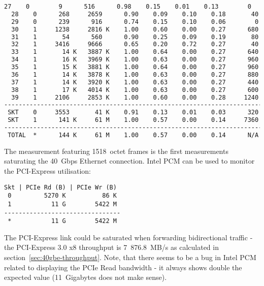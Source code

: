 \begin{lstlisting}[language=TeX]
  27    0        9      516      0.98    0.15    0.01    0.13        0
  28    0      268     2659      0.90    0.09    0.10    0.18       40
  29    0      239      916      0.74    0.15    0.10    0.06        0
  30    1     1238     2816 K    1.00    0.60    0.00    0.27      680
  31    1       54      560      0.90    0.25    0.09    0.19       80
  32    1     3416     9666      0.65    0.20    0.72    0.27       40
  33    1       14 K   3887 K    1.00    0.64    0.00    0.27      640
  34    1       16 K   3969 K    1.00    0.63    0.00    0.27      960
  35    1       15 K   3881 K    1.00    0.64    0.00    0.27      960
  36    1       14 K   3878 K    1.00    0.63    0.00    0.27      880
  37    1       14 K   3920 K    1.00    0.63    0.00    0.27      440
  38    1       17 K   4014 K    1.00    0.63    0.00    0.27      600
  39    1     2106     2853 K    1.00    0.60    0.00    0.28     1240
------------------------------------------------------------------------
 SKT    0     3553       41 K    0.91    0.13    0.01    0.03      320
 SKT    1      141 K     61 M    1.00    0.57    0.00    0.14     7360
------------------------------------------------------------------------
 TOTAL  *      144 K     61 M    1.00    0.57    0.00    0.14      N/A 
\end{lstlisting}
The measurement featuring 1518~octet frames is the first measurements saturating the 40~Gbps Ethernet connection.
Intel PCM can be used to monitor the PCI-Express utilisation:
\begin{lstlisting}
Skt | PCIe Rd (B) | PCIe Wr (B)
 0         5270 K          86 K
 1           11 G        5422 M
--------------------------------
 *           11 G        5422 M
\end{lstlisting}
The PCI-Express link could be saturated when forwarding bidirectional traffic
- the PCI-Express 3.0 x8 throughput is 7~876.8~MB/s as calculated in section~\ref{sec:40gbe-throughput}.
Note, that there seems to be a bug in Intel PCM related to displaying
the PCIe Read bandwidth - it always shows double the expected value (11~Gigabytes does not make sense).
